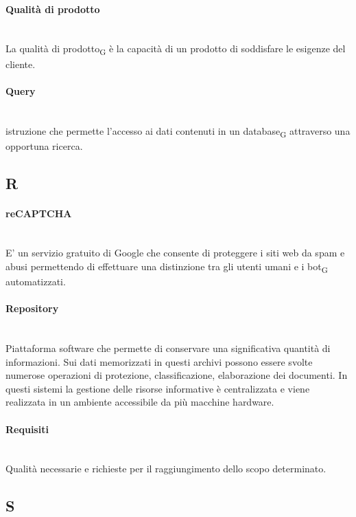 \paragraph{Qualità di prodotto}~\smallskip \\
La qualità di prodotto\textsubscript{G} è la capacità di un prodotto di soddisfare le esigenze del cliente.
\paragraph{Query}~\smallskip \\
istruzione che permette l'accesso ai dati contenuti in un database\textsubscript{G} attraverso una opportuna ricerca.

\newpage
{}
\subsection*{R}
\paragraph{reCAPTCHA}~\smallskip \\
E' un servizio gratuito di Google che consente di proteggere i siti web da spam e abusi permettendo di effettuare una distinzione tra gli utenti umani e i bot\textsubscript{G} automatizzati.

\paragraph{Repository}~\smallskip \\
Piattaforma software che permette di conservare una significativa quantità di informazioni. Sui dati memorizzati in questi archivi possono essere svolte numerose operazioni di protezione, classificazione, elaborazione dei documenti. In questi sistemi la gestione delle risorse informative è centralizzata e viene realizzata in un ambiente accessibile da più macchine hardware.

\paragraph{Requisiti}~\smallskip \\
Qualità necessarie e richieste per il raggiungimento dello scopo determinato.
\newpage
{}
\subsection*{S}
